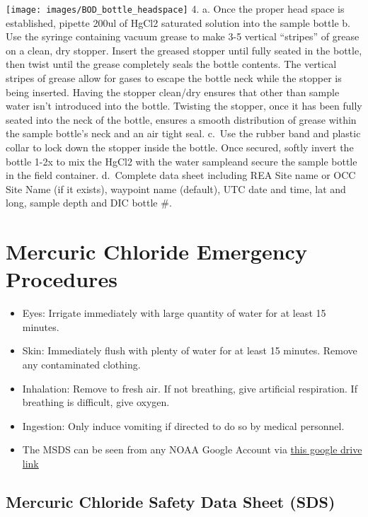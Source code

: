 \documentclass[]{book}
\providecommand{\tightlist}{%
  \setlength{\itemsep}{0pt}\setlength{\parskip}{0pt}}
\begin{document}
\texttt{[image: images/BOD\_bottle\_headspace]}
4.
a. Once the proper head space is established, pipette 200ul of HgCl2 saturated solution into the sample bottle
b. Use the syringe containing vacuum grease to make 3-5 vertical ``stripes'' of grease on a clean, dry stopper. Insert the greased stopper until fully seated in the bottle, then twist until the grease completely seals the bottle contents. The vertical stripes of grease allow for gases to escape the bottle neck while the stopper is being inserted. Having the stopper clean/dry ensures that other than sample water isn't introduced into the bottle. Twisting the stopper, once it has been fully seated into the neck of the bottle, ensures a smooth distribution of grease within the sample bottle's neck and an air tight seal.
c.~Use the rubber band and plastic collar to lock down the stopper inside the bottle. Once secured, softly invert the bottle 1-2x to mix the HgCl2 with the water sampleand secure the sample bottle in the field container.
d.~Complete data sheet including REA Site name or OCC Site Name (if it exists), waypoint name (default), UTC date and time, lat and long, sample depth and DIC bottle \#.

\hypertarget{mercuric-chloride-emergency-procedures}{%
\section{Mercuric Chloride Emergency Procedures}\label{mercuric-chloride-emergency-procedures}}

\begin{itemize}
\tightlist
\item
  Eyes: Irrigate immediately with large quantity of water for at least 15 minutes.
\item
  Skin: Immediately flush with plenty of water for at least 15 minutes. Remove any contaminated clothing.
\item
  Inhalation: Remove to fresh air. If not breathing, give artificial respiration. If breathing is difficult, give oxygen.
\item
  Ingestion: Only induce vomiting if directed to do so by medical personnel.
\item
  The MSDS can be seen from any NOAA Google Account via \href{https://drive.google.com/open?id=12w0Kmi8VVE9n_0A5_BhNVq6l4nMDtM1K}{this google drive link}
\end{itemize}

\hypertarget{mercuric-chloride-safety-data-sheet-sds}{%
\subsection{Mercuric Chloride Safety Data Sheet (SDS)}\label{mercuric-chloride-safety-data-sheet-sds}}
\end{document}
